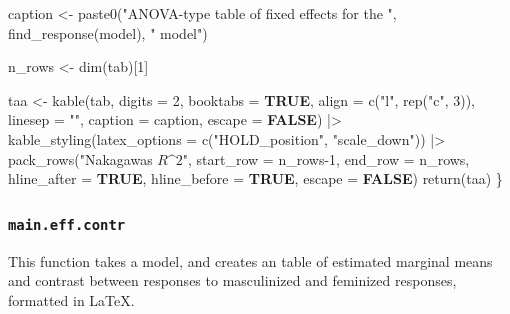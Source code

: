 \documentclass[
  bookmarksnumbered]{article}
\newenvironment{Shaded}{\begin{snugshade}}{\end{snugshade}}
\newcommand{\AttributeTok}[1]{\textcolor[rgb]{0.80,0.80,0.80}{#1}}
\newcommand{\ConstantTok}[1]{\textcolor[rgb]{0.86,0.64,0.64}{\textbf{#1}}}
\newcommand{\DecValTok}[1]{\textcolor[rgb]{0.86,0.86,0.80}{#1}}
\newcommand{\FunctionTok}[1]{\textcolor[rgb]{0.94,0.94,0.56}{#1}}
\newcommand{\NormalTok}[1]{\textcolor[rgb]{0.80,0.80,0.80}{#1}}
\newcommand{\OtherTok}[1]{\textcolor[rgb]{0.94,0.94,0.56}{#1}}
\newcommand{\SpecialCharTok}[1]{\textcolor[rgb]{0.86,0.64,0.64}{#1}}
\newcommand{\StringTok}[1]{\textcolor[rgb]{0.80,0.58,0.58}{#1}}
\begin{document}
\begin{Shaded}
\begin{Highlighting}[]
\NormalTok{  caption }\OtherTok{\textless{}{-}} \FunctionTok{paste0}\NormalTok{(}\StringTok{"ANOVA{-}type table of fixed effects for the "}\NormalTok{, }\FunctionTok{find\_response}\NormalTok{(model), }\StringTok{" model"}\NormalTok{)}
  
\NormalTok{  n\_rows }\OtherTok{\textless{}{-}} \FunctionTok{dim}\NormalTok{(tab)[}\DecValTok{1}\NormalTok{]}
  
\NormalTok{  taa }\OtherTok{\textless{}{-}} \FunctionTok{kable}\NormalTok{(tab,}
               \AttributeTok{digits =} \DecValTok{2}\NormalTok{,}
               \AttributeTok{booktabs =} \ConstantTok{TRUE}\NormalTok{,}
               \AttributeTok{align =} \FunctionTok{c}\NormalTok{(}\StringTok{"l"}\NormalTok{, }\FunctionTok{rep}\NormalTok{(}\StringTok{"c"}\NormalTok{, }\DecValTok{3}\NormalTok{)),}
               \AttributeTok{linesep =} \StringTok{""}\NormalTok{,}
               \AttributeTok{caption =}\NormalTok{ caption,}
               \AttributeTok{escape =} \ConstantTok{FALSE}\NormalTok{) }\SpecialCharTok{|\textgreater{}}
    \FunctionTok{kable\_styling}\NormalTok{(}\AttributeTok{latex\_options =} \FunctionTok{c}\NormalTok{(}\StringTok{"HOLD\_position"}\NormalTok{, }\StringTok{"scale\_down"}\NormalTok{)) }\SpecialCharTok{|\textgreater{}}
    \FunctionTok{pack\_rows}\NormalTok{(}\StringTok{"Nakagawa\textquotesingle{}s $R\^{}2$"}\NormalTok{,}
              \AttributeTok{start\_row =}\NormalTok{ n\_rows}\DecValTok{{-}1}\NormalTok{, }\AttributeTok{end\_row =}\NormalTok{ n\_rows,}
              \AttributeTok{hline\_after =} \ConstantTok{TRUE}\NormalTok{, }\AttributeTok{hline\_before =} \ConstantTok{TRUE}\NormalTok{,}
              \AttributeTok{escape =} \ConstantTok{FALSE}\NormalTok{)}
  \FunctionTok{return}\NormalTok{(taa)}
\NormalTok{\}}
\end{Highlighting}
\end{Shaded}

\subsubsection{\texorpdfstring{\texttt{main.eff.contr}}{main.eff.contr}}\label{main.eff.contr}

This function takes a model, and creates an table of estimated marginal means and contrast between responses to masculinized and feminized responses, formatted in \LaTeX.
\end{document}
